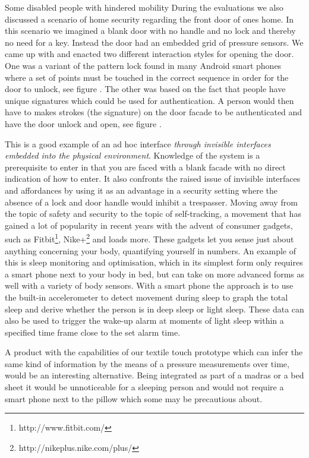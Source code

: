 Some disabled people with hindered mobility 
\blank
During the evaluations we also discussed a scenario of home security regarding the front door of ones home.
In this scenario we imagined a blank door with no handle and no lock and thereby no need for a key.
Instead the door had an embedded grid of pressure sensors.
We came up with and enacted two different interaction styles for opening the door.
One was a variant of the pattern lock found in many Android smart phones where a set of points must be touched in the correct sequence in order for the door to unlock, see figure .
The other was based on the fact that people have unique signatures which could be used for authentication.
A person would then have to makes strokes (the signature) on the door facade to be authenticated and have the door unlock and open, see figure .

This is a good example of an ad hoc interface \emph{through invisible interfaces embedded into the physical environment}.
Knowledge of the system is a prerequisite to enter in that you are faced with a blank facade with no direct indication of how to enter.
It also confronts the raised issue of invisible interfaces and affordances by using it as an advantage in a security setting where the absence of a lock and door handle would inhibit a trespasser.
\blank
Moving away from the topic of safety and security to the topic of self-tracking, a movement that has gained a lot of popularity in recent years with the advent of consumer gadgets, such as Fitbit\footnote{http://www.fitbit.com/}, Nike+\footnote{http://nikeplus.nike.com/plus/} and loads more. 
These gadgets let you sense just about anything concerning your body, quantifying yourself in numbers.
An example of this is sleep monitoring and optimisation, which in its simplest form only requires a smart phone next to your body in bed, but can take on more advanced forms as well with a variety of body sensors.
With a smart phone the approach is to use the built-in accelerometer to detect movement during sleep to graph the total sleep and derive whether the person is in deep sleep or light sleep.
These data can also be used to trigger the wake-up alarm at moments of light sleep within a specified time frame close to the set alarm time.

A product with the capabilities of our textile touch prototype which can infer the same kind of information by the means of a pressure measurements over time, would be an interesting alternative.
Being integrated as part of a madras or a bed sheet it would be unnoticeable for a sleeping person and would not require a smart phone next to the pillow which some may be precautious about.

